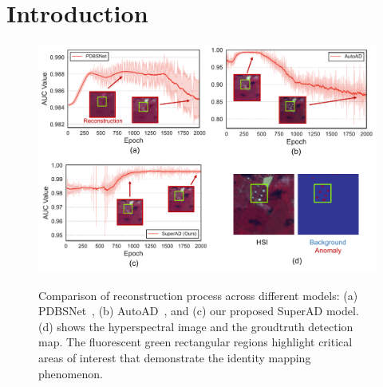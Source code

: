\section{Introduction}
\label{sec:intro}


\begin{figure}[t]
  \centering
  {\includegraphics[width=1\linewidth]{Figures/PDF/teaser.pdf}}
  \caption{Comparison of reconstruction process across different models: (a) PDBSNet~\cite{PDBSNet}, (b) AutoAD~\cite{AutoAD}, and (c) our proposed SuperAD model. (d) shows the hyperspectral image and the groudtruth detection map. The fluorescent green rectangular regions highlight critical areas of interest that demonstrate the identity mapping phenomenon.}
  \label{fig:intro-imp}
\end{figure}



